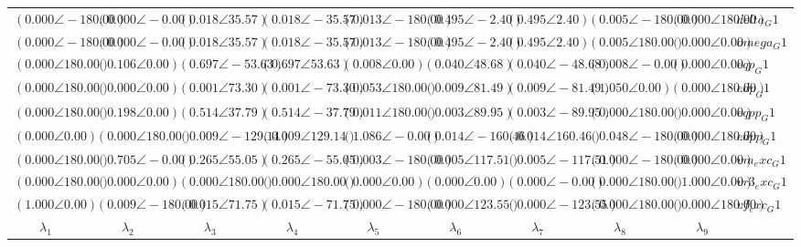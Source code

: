 \begin{tabular}{lllllllll|l}
$(0.000 \angle -180.00)$	& $(0.000 \angle -0.00)$	& $(0.018 \angle 35.57)$	& $(0.018 \angle -35.57)$	& $(0.013 \angle -180.00)$	& $\mathbf{(0.495 \angle -2.40)}$	& $\mathbf{(0.495 \angle 2.40)}$	& $(0.005 \angle -180.00)$	& $(0.000 \angle 180.00)$	& $delta_G1$ \\ 
$(0.000 \angle -180.00)$	& $(0.000 \angle -0.00)$	& $(0.018 \angle 35.57)$	& $(0.018 \angle -35.57)$	& $(0.013 \angle -180.00)$	& $\mathbf{(0.495 \angle -2.40)}$	& $\mathbf{(0.495 \angle 2.40)}$	& $(0.005 \angle 180.00)$	& $(0.000 \angle 0.00)$	& $omega_G1$ \\ 
$(0.000 \angle 180.00)$	& $\mathbf{(0.106 \angle 0.00)}$	& $\mathbf{(0.697 \angle -53.63)}$	& $\mathbf{(0.697 \angle 53.63)}$	& $(0.008 \angle 0.00)$	& $(0.040 \angle 48.68)$	& $(0.040 \angle -48.68)$	& $(0.008 \angle -0.00)$	& $(0.000 \angle 0.00)$	& $eqp_G1$ \\ 
$(0.000 \angle 180.00)$	& $(0.000 \angle 0.00)$	& $(0.001 \angle 73.30)$	& $(0.001 \angle -73.30)$	& $\mathbf{(0.053 \angle 180.00)}$	& $(0.009 \angle 81.49)$	& $(0.009 \angle -81.49)$	& $\mathbf{(1.050 \angle 0.00)}$	& $(0.000 \angle 180.00)$	& $edp_G1$ \\ 
$(0.000 \angle 180.00)$	& $\mathbf{(0.198 \angle 0.00)}$	& $\mathbf{(0.514 \angle 37.79)}$	& $\mathbf{(0.514 \angle -37.79)}$	& $(0.011 \angle 180.00)$	& $(0.003 \angle 89.95)$	& $(0.003 \angle -89.95)$	& $(0.000 \angle 180.00)$	& $(0.000 \angle 0.00)$	& $eqpp_G1$ \\ 
$(0.000 \angle 0.00)$	& $(0.000 \angle 180.00)$	& $(0.009 \angle -129.14)$	& $(0.009 \angle 129.14)$	& $\mathbf{(1.086 \angle -0.00)}$	& $(0.014 \angle -160.46)$	& $(0.014 \angle 160.46)$	& $(0.048 \angle -180.00)$	& $(0.000 \angle 180.00)$	& $edpp_G1$ \\ 
$(0.000 \angle 180.00)$	& $\mathbf{(0.705 \angle -0.00)}$	& $\mathbf{(0.265 \angle 55.05)}$	& $\mathbf{(0.265 \angle -55.05)}$	& $(0.003 \angle -180.00)$	& $(0.005 \angle 117.51)$	& $(0.005 \angle -117.51)$	& $(0.000 \angle -180.00)$	& $(0.000 \angle 0.00)$	& $vm_exc_G1$ \\ 
 \hline 
$(0.000 \angle 180.00)$	& $(0.000 \angle 0.00)$	& $(0.000 \angle 180.00)$	& $(0.000 \angle 180.00)$	& $(0.000 \angle 0.00)$	& $(0.000 \angle 0.00)$	& $(0.000 \angle -0.00)$	& $(0.000 \angle 180.00)$	& $\mathbf{(1.000 \angle 0.00)}$	& $vr3_exc_G1$ \\ 
$\mathbf{(1.000 \angle 0.00)}$	& $(0.009 \angle -180.00)$	& $(0.015 \angle 71.75)$	& $(0.015 \angle -71.75)$	& $(0.000 \angle -180.00)$	& $(0.000 \angle 123.55)$	& $(0.000 \angle -123.55)$	& $(0.000 \angle 180.00)$	& $(0.000 \angle 180.00)$	& $vf_exc_G1$ \\ 
 \hline 
\hline 
$\qquad\lambda_{1}$	&$\qquad\lambda_{2}$	&$\qquad\lambda_{3}$	&$\qquad\lambda_{4}$	&$\qquad\lambda_{5}$	&$\qquad\lambda_{6}$	&$\qquad\lambda_{7}$	&$\qquad\lambda_{8}$	&$\qquad\lambda_{9}$	&
\end{tabular}

